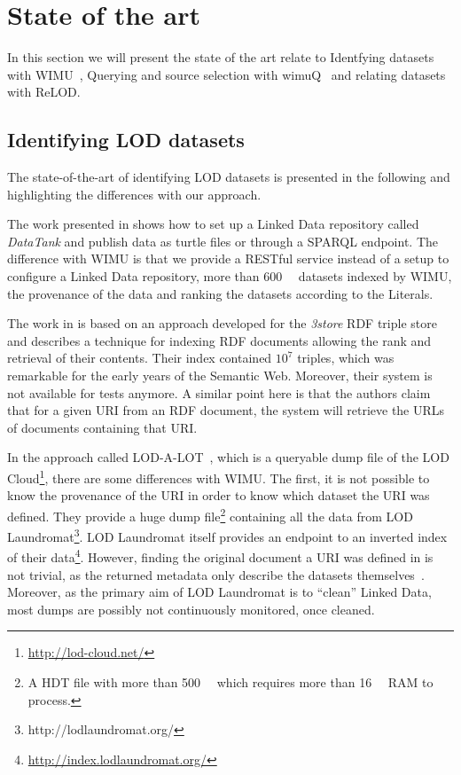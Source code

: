 \documentclass[sw]{iosart2x}
\begin{document}
\section{State of the art}
\label{sec:related}

In this section we will present the state of the art relate to Identfying datasets with WIMU~\cite{valdestilhas2018my}, Querying and source selection with wimuQ~\cite{valdestilhas2019more} and relating datasets with ReLOD.

\subsection{Identifying LOD datasets}
The state-of-the-art of identifying LOD datasets is presented in the following and highlighting the differences with our approach.

The work presented in \cite{colpaert2014painless} shows how to set up a Linked Data repository called \emph{DataTank} and publish data as turtle files or through a SPARQL endpoint.
The difference with WIMU is that we provide a RESTful service instead of a setup to configure a Linked Data repository{\color{blue}, more than \SI{600}{\kilo\nothing} datasets indexed by WIMU, the provenance of the data and ranking the datasets according to the Literals}.

The work in \cite{harris2004semindex} is based on an approach developed for the \emph{3store} RDF triple store and describes a technique for indexing RDF documents allowing the rank and retrieval of their contents. 
Their index contained $10^7$ triples, which was remarkable for the early years of the Semantic Web.
Moreover, their system is not available for tests anymore.
A similar point here is that the authors claim that for a given URI from an RDF document, the system will retrieve the URLs of documents containing that URI.

In the approach called LOD-A-LOT~\cite{fernandez2017lod}, which is a queryable dump file of the LOD Cloud\footnote{\url{http://lod-cloud.net/}}, there are some differences with WIMU.
The first, it is not possible to know the provenance of the URI in order to know which dataset the URI was defined. 
They provide a huge dump file\footnote{A HDT file with more than \SI{500}{\gibi\byte} which requires more than \SI{16 }{\gibi\byte} RAM to process.} containing all the data from LOD Laundromat\footnote{http://lodlaundromat.org/}.
LOD Laundromat itself provides an endpoint to an inverted index of their data\footnote{\url{http://index.lodlaundromat.org/}}.
However, finding the original document a URI was defined in is not trivial, as the returned metadata only describe the datasets themselves~\cite{beek2014lod}.
Moreover, as the primary aim of LOD Laundromat is to \enquote{clean} Linked Data, most dumps are possibly not continuously monitored, once cleaned.
\end{document}
